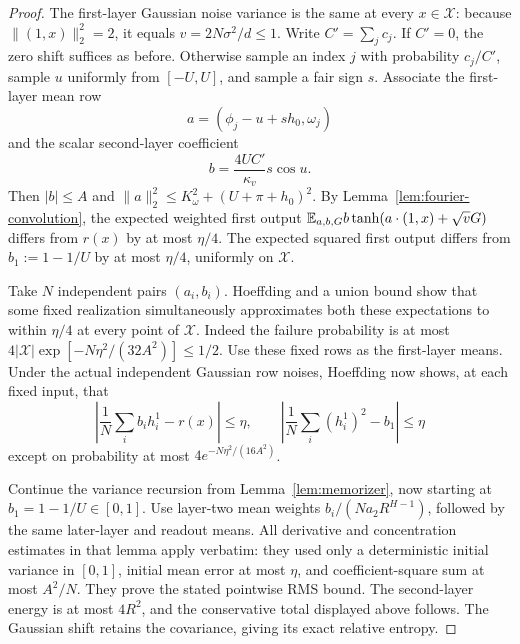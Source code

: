 \begin{proof}
The first-layer Gaussian noise variance is the same at every $x\in\mathcal X$: because $\|(1,x)\|_2^2=2$, it equals $v=2N\sigma^2/d\le1$. Write $C'=\sum_jc_j$. If $C'=0$, the zero shift suffices as before. Otherwise sample an index $j$ with probability $c_j/C'$, sample $u$ uniformly from $[-U,U]$, and sample a fair sign $s$. Associate the first-layer mean row
\[
 a=(\phi_j-u+sh_0,\omega_j)
\]
and the scalar second-layer coefficient
\[
 b=\frac{4UC'}{\kappa_v}s\cos u.
\]
Then $|b|\le A$ and $\|a\|_2^2\le K_\omega^2+(U+\pi+h_0)^2$.
By Lemma~\ref{lem:fourier-convolution}, the expected weighted first output
$\mathbb E_{a,b,G}b\tanh(a\cdot(1,x)+\sqrt vG)$ differs from $r(x)$ by at most $\eta/4$. The expected squared first output differs from $b_1:=1-1/U$ by at most $\eta/4$, uniformly on $\mathcal X$.

Take $N$ independent pairs $(a_i,b_i)$. Hoeffding and a union bound show that some fixed realization simultaneously approximates both these expectations to within $\eta/4$ at every point of $\mathcal X$. Indeed the failure probability is at most
$4|\mathcal X|\exp[-N\eta^2/(32A^2)]\le1/2$.
Use these fixed rows as the first-layer means. Under the actual independent Gaussian row noises, Hoeffding now shows, at each fixed input, that
\[
 \left|\frac1N\sum_i b_i h_i^1-r(x)\right|\le\eta,
 \qquad
 \left|\frac1N\sum_i(h_i^1)^2-b_1\right|\le\eta
\]
except on probability at most $4e^{-N\eta^2/(16A^2)}$.

Continue the variance recursion from Lemma~\ref{lem:memorizer}, now starting at $b_1=1-1/U\in[0,1]$. Use layer-two mean weights
$b_i/(Na_2R^{H-1})$, followed by the same later-layer and readout means. All derivative and concentration estimates in that lemma apply verbatim: they used only a deterministic initial variance in $[0,1]$, initial mean error at most $\eta$, and coefficient-square sum at most $A^2/N$. They prove the stated pointwise RMS bound. The second-layer energy is at most $4R^2$, and the conservative total displayed above follows. The Gaussian shift retains the covariance, giving its exact relative entropy.
\end{proof}

